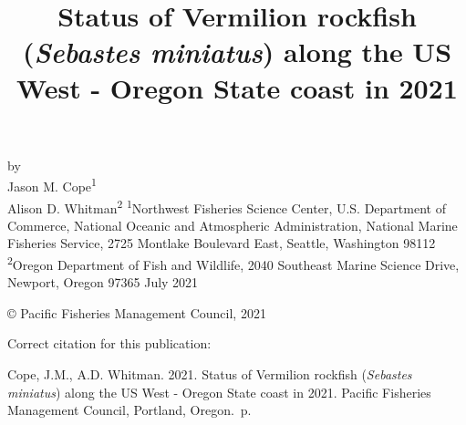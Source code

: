 \documentclass[11pt,
  english,
  a4paper,
]{article}
\date{}
\newcommand{\trTitle}{Status of Vermilion rockfish (\emph{Sebastes miniatus}) along the US West - Oregon State coast in 2021}
\newcommand{\trYear}{2021}
\newcommand{\trMonth}{July}
\newcommand{\trAuthsBack}{Cope, J.M., A.D. Whitman}
\newcommand{\trCitation}{
\begin{hangparas}{1em}{1}
\trAuthsBack{}. \trYear{}. \trTitle{}. Pacific Fisheries Management Council, Portland, Oregon. \pageref{LastPage}{}\,p.
\end{hangparas}}
\begin{document}

\renewcommand*{\thefootnote}{\fnsymbol{footnote}}

\small
\thispagestyle{empty}
\noindent
\begin{center}
\title{Status of Vermilion rockfish (\emph{Sebastes miniatus}) along the US West - Oregon State coast in 2021}
\vspace{1.5cm}
{\Large\textbf{}}
\vfill
by\\
Jason M. Cope\textsuperscript{1}\\
Alison D. Whitman\textsuperscript{2}\vfill
\textsuperscript{1}Northwest Fisheries Science Center, U.S. Department of Commerce, National Oceanic and Atmospheric Administration, National Marine Fisheries Service, 2725 Montlake Boulevard East, Seattle, Washington 98112\\
\textsuperscript{2}Oregon Department of Fish and Wildlife, 2040 Southeast Marine Science Drive, Newport, Oregon 97365\vfill
\trMonth{} \trYear{}
\end{center}
\clearpage

\thispagestyle{empty}
\vspace*{\fill}
\begin{center}
\copyright{} Pacific Fisheries Management Council, \trYear{}\\
\end{center}
\par
\bigskip
\noindent
Correct citation for this publication:
\bigskip
\par
\trCitation{}
\clearpage


\tableofcontents\clearpage
\label{TRlastRoman}
\clearpage

\newpage
\thispagestyle{empty} %

\pagestyle{plain}  %
\renewcommand*{\thefootnote}{\arabic{footnote}}  %
\setcounter{footnote}{0}  %
\renewcommand{\headrulewidth}{0.5pt}
\renewcommand{\footrulewidth}{0.5pt}
\end{document}
